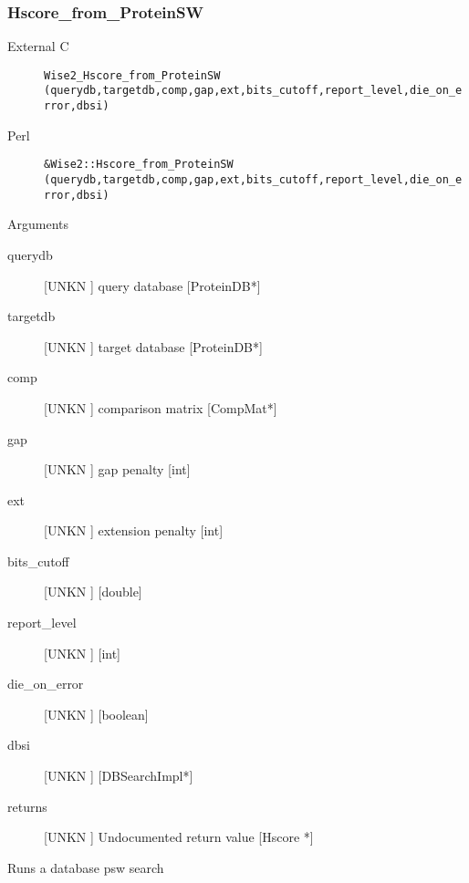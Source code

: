 \subsubsection{Hscore_from_ProteinSW}
\begin{description}
\item[External C] {\tt Wise2_Hscore_from_ProteinSW (querydb,targetdb,comp,gap,ext,bits_cutoff,report_level,die_on_error,dbsi)}
\item[Perl] {\tt &Wise2::Hscore_from_ProteinSW (querydb,targetdb,comp,gap,ext,bits_cutoff,report_level,die_on_error,dbsi)}

\end{description}
Arguments
\begin{description}
\item[querydb] [UNKN ] query database  [ProteinDB*]
\item[targetdb] [UNKN ] target database [ProteinDB*]
\item[comp] [UNKN ] comparison matrix [CompMat*]
\item[gap] [UNKN ] gap penalty [int]
\item[ext] [UNKN ] extension penalty [int]
\item[bits_cutoff] [UNKN ]  [double]
\item[report_level] [UNKN ]  [int]
\item[die_on_error] [UNKN ]  [boolean]
\item[dbsi] [UNKN ]  [DBSearchImpl*]
\item[returns] [UNKN ] Undocumented return value [Hscore *]
\end{description}
Runs a database psw search 


